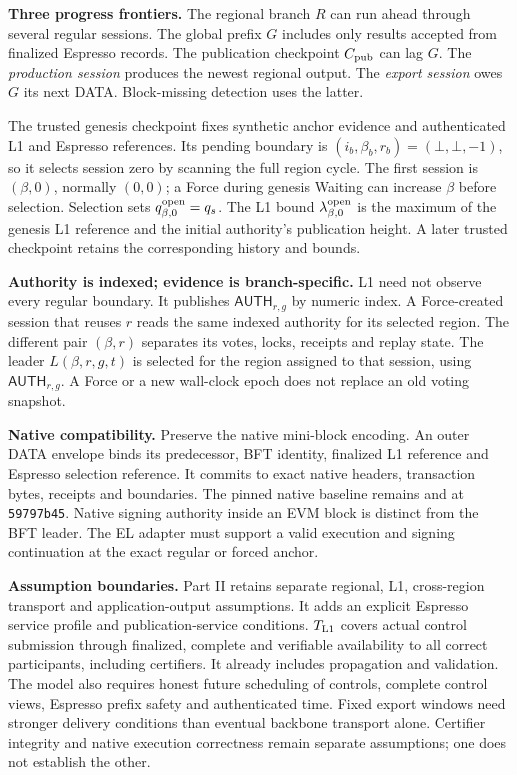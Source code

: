 \documentclass[11pt,a4paper]{article}
\newcommand{\api}[1]{\ensuremath{\mathsf{#1}}}
\newcommand{\src}[2]{\href{#1}{\texttt{\detokenize{#2}}}}
\begin{document}
\textbf{Three progress frontiers.} The regional branch $R$ can run ahead
through several regular sessions. The global prefix $G$ includes only
results accepted from finalized Espresso records. The publication
checkpoint $C_{\rm pub}$ can lag $G$. The \emph{production session}
produces the newest regional output. The \emph{export session} owes
$G$ its next DATA. Block-missing detection uses the latter.

The trusted genesis checkpoint fixes synthetic anchor evidence and
authenticated L1 and Espresso references. Its pending boundary is
$(i_b,\beta_b,r_b)=(\bot,\bot,-1)$, so it selects session zero by
scanning the full region cycle. The first session is $(\beta,0)$,
normally $(0,0)$; a Force during genesis Waiting can increase $\beta$
before selection. Selection sets $q^{\rm open}_{\beta,0}=q_s$.
The L1 bound $\lambda^{\rm open}_{\beta,0}$ is the maximum of the
genesis L1 reference and the initial authority's publication height. A later trusted checkpoint
retains the corresponding history and bounds.

\textbf{Authority is indexed; evidence is branch-specific.}
L1 need not observe every regular boundary. It publishes
$\api{AUTH}_{r,g}$ by numeric index. A Force-created session that reuses
$r$ reads the same indexed authority for its selected region. The different pair
$(\beta,r)$ separates its votes, locks, receipts and replay state.
The leader $L(\beta,r,g,t)$ is selected for the region assigned to that
session, using $\api{AUTH}_{r,g}$. A Force or a new wall-clock epoch does not replace an
old voting snapshot.

\textbf{Native compatibility.} Preserve the native mini-block encoding.
An outer DATA envelope binds its predecessor, BFT identity, finalized
L1 reference and Espresso selection reference. It commits to exact
native headers, transaction bytes, receipts and boundaries. The pinned
native baseline remains
\src{../megaeth_specs/specs/protocol/blocks.md}{blocks.md} and
\src{../megaeth_specs/specs/protocol/state-sync.md}{state-sync.md}
at \texttt{59797b45}. Native signing authority inside an EVM block is
distinct from the BFT leader. The EL adapter must support a valid
execution and signing continuation at the exact regular or forced anchor.

\textbf{Assumption boundaries.} Part II retains separate regional,
L1, cross-region transport and application-output assumptions. It adds
an explicit Espresso service profile and publication-service conditions.
$T_{\rm L1}$ covers actual control submission through finalized,
complete and verifiable availability to all correct participants,
including certifiers. It already includes propagation and validation.
The model also requires honest future scheduling of controls, complete
control views, Espresso prefix safety and authenticated time. Fixed
export windows need stronger delivery conditions than eventual backbone
transport alone. Certifier integrity and native execution correctness
remain separate assumptions; one does not establish the other.
\end{document}
